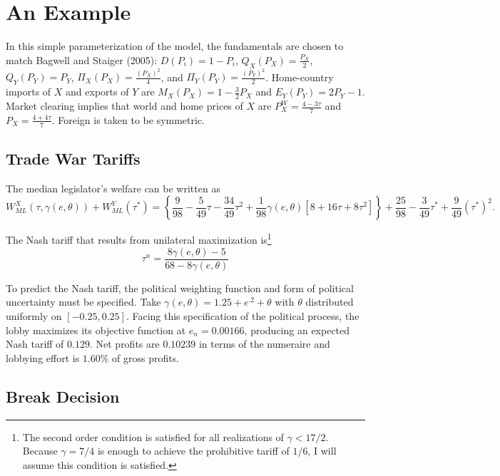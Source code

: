 \documentclass[10pt]{article}
\newcommand{\ve}{\theta}
\newcommand{\ta}{\theta}
\newcommand{\ga}{\gamma}
\begin{document}
\section{An Example}
\label{sec:example}
In this simple parameterization of the model, the fundamentals are chosen to match Bagwell and Staiger (2005): $D(P_i) = 1 - P_i$, $Q_X(P_X) = \frac{P_X}{2}$, $Q_Y(P_Y) = P_Y$, $\Pi_X(P_X) = \frac{(P_X)^2}{4}$, and $\Pi_Y(P_Y) = \frac{(P_Y)^2}{2}$. Home-country imports of $X$ and exports of $Y$ are $M_X(P_X)= 1 - \frac{3}{2}P_X$ and $E_Y(P_Y)= 2P_Y -1$. Market clearing implies that world and home prices of $X$ are $P_X^W = \frac{4-3\tau}{7}$ and $P_X = \frac{4+4\tau}{7}$. Foreign is taken to be symmetric.

\subsection{Trade War Tariffs}
The median legislator's welfare can be written as 
\[
  W_{\mathit{ML}}^X(\tau,\ga(e,\ve)) + W_{\mathit{ML}}^Y(\tau^*) = \left\{\frac{9}{98} - \frac{5}{49}\tau - \frac{34}{49}\tau^2 +\frac{1}{98}\ga(e,\ve)\left[ 8 + 16\tau + 8\tau^2 \right] \right\}+ \frac{25}{98} - \frac{3}{49}\tau^* + \frac{9}{49}(\tau^*)^2.
\]

The Nash tariff that results from unilateral maximization is\footnote{The second order condition is satisfied for all realizations of $\ga < 17/2$. Because $\ga = 7/4$ is enough to achieve the prohibitive tariff of $1/6$, I will assume this condition is satisfied.}
\[
  \tau^n = \frac{8\ga(e,\ve)-5}{68-8\ga(e,\ve)}
\]

To predict the Nash tariff, the political weighting function and form of political uncertainty must be specified. Take $\ga(e,\ve) = 1.25 + e^{.2} + \ta$ with $\ve$ distributed uniformly on $[-0.25,0.25]$. Facing this specification of the political process, the lobby maximizes its objective function at $e_n = 0.00166$, producing an expected Nash tariff of $0.129$. Net profits are $0.10239$ in terms of the numeraire and lobbying effort is $1.60\%$ of gross profits.

\subsection{Break Decision}
\end{document}
